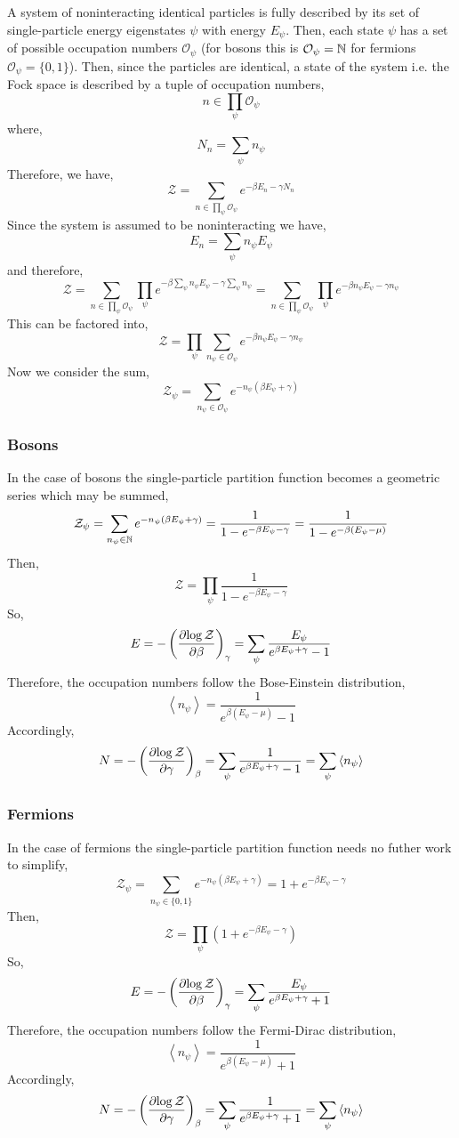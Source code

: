 \documentclass[12pt]{article}
\begin{document}
A system of noninteracting identical particles is fully described by its set of single-particle energy eigenstates $\psi$ with energy $E_\psi$. Then, each state $\psi$ has a set of possible occupation numbers $\mathcal{O}_\psi$ (for bosons this is $\mathcal{O}_\psi = \mathbb{N}$ for fermions $\mathcal{O}_\psi = \{ 0, 1 \}$). Then, since the particles are identical, a state of the system i.e. the Fock space is described by a tuple of occupation numbers,
\[ n \in \prod_{\psi} \mathcal{O}_\psi \]
where,
\[ N_n = \sum_{\psi} n_\psi \]
Therefore, we have,
\[ \mathcal{Z} = \sum_{n \in \prod_{\psi} \mathcal{O}_\psi} e^{- \beta E_n - \gamma N_n} \]
Since the system is assumed to be noninteracting we have,
\[ E_n = \sum_{\psi} n_\psi E_\psi \]
and therefore,
\[ \mathcal{Z} = \sum_{n \in \prod_{\psi} \mathcal{O}_\psi} \prod_{\psi} e^{- \beta \sum_\psi n_\psi E_\psi - \gamma \sum_{\psi} n_\psi } =  \sum_{n \in \prod_{\psi} \mathcal{O}_\psi} \prod_{\psi} e^{- \beta n_\psi E_\psi  - \gamma n_\psi} \]
This can be factored into,
\[ \mathcal{Z} = \prod_{\psi} \sum_{n_\psi \in \mathcal{O}_\psi}  e^{- \beta n_\psi E_\psi  - \gamma n_\psi} \]
Now we consider the sum,
\[ \mathcal{Z}_\psi = \sum_{n_\psi \in \mathcal{O}_\psi}   e^{- n_\psi (\beta  E_\psi  + \gamma)} \]

\subsubsection{Bosons}

In the case of bosons the single-particle partition function becomes a geometric series which may be summed, 
\[  \mathcal{Z}_\psi = \sum_{n_\psi \in \mathbb{N}}  e^{- n_\psi (\beta  E_\psi  + \gamma)} = \frac{1}{1 - e^{- \beta E_\psi - \gamma}} = \frac{1}{1 - e^{-\beta (E_\psi - \mu)}} \]
Then,
\[ \mathcal{Z} = \prod_{\psi} \frac{1}{1 - e^{- \beta E_\psi - \gamma}}  \]
So,
\[ E = - \left( \frac{\partial{\log{\mathcal{Z}}}}{\partial{\beta}} \right)_\gamma = \sum_\psi \frac{E_\psi}{e^{\beta E_\psi + \gamma} - 1} \]
Therefore, the occupation numbers follow the Bose-Einstein distribution,
\[ \left< n_\psi \right> = \frac{1}{e^{\beta (E_\psi - \mu)} - 1} \]
Accordingly,
\[ N = - \left( \frac{\partial{\log{\mathcal{Z}}}}{\partial{\gamma}} \right)_\beta = \sum_{\psi} \frac{1}{e^{\beta E_\psi + \gamma} - 1} = \sum_{\psi} \left< n_\psi \right> \]

\subsubsection{Fermions}

In the case of fermions the single-particle partition function needs no futher work to simplify,
\[  \mathcal{Z}_\psi = \sum_{n_\psi \in \{ 0, 1 \} }  e^{- n_\psi (\beta  E_\psi  + \gamma)} = 1 + e^{- \beta E_\psi - \gamma} \]
Then,
\[ \mathcal{Z} = \prod_{\psi} \left( 1 +  e^{- \beta E_\psi - \gamma} \right)  \]
So,
\[ E = - \left( \frac{\partial{\log{\mathcal{Z}}}}{\partial{\beta}} \right)_\gamma = \sum_\psi \frac{E_\psi}{e^{\beta E_\psi + \gamma} + 1} \]
Therefore, the occupation numbers follow the Fermi-Dirac distribution,
\[ \left< n_\psi \right> = \frac{1}{e^{\beta (E_\psi - \mu)} + 1} \]
Accordingly,
\[ N = - \left( \frac{\partial{\log{\mathcal{Z}}}}{\partial{\gamma}} \right)_\beta = \sum_{\psi} \frac{1}{e^{\beta E_\psi + \gamma} + 1} = \sum_{\psi} \left< n_\psi \right> \]
\end{document}
